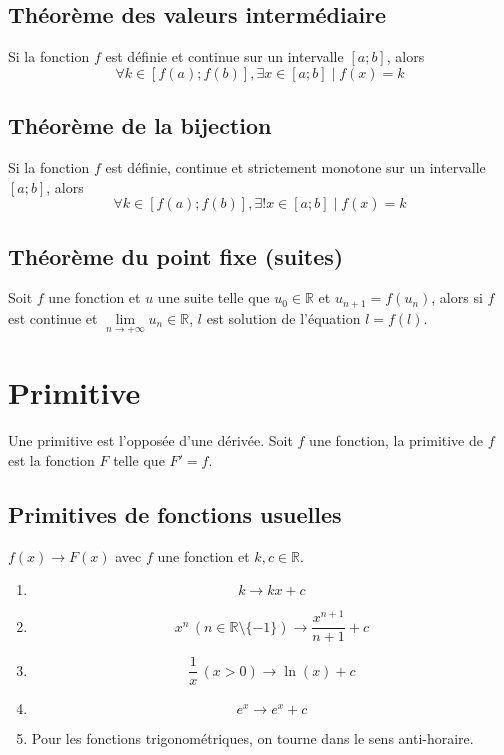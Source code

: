 \documentclass{article}
\begin{document}
\subsection{Théorème des valeurs intermédiaire}
Si la fonction $f$ est définie et continue sur un intervalle $[a;b]$, alors $$\forall k \in [f(a);f(b)], \exists x \in [a;b] \mid f(x) = k$$
\subsection{Théorème de la bijection}
Si la fonction $f$ est définie, continue et strictement monotone sur un intervalle $[a;b]$, alors $$\forall k \in [f(a);f(b)], \exists ! x \in [a;b] \mid f(x) = k$$
\subsection{Théorème du point fixe (suites)}
Soit $f$ une fonction et $u$ une suite telle que $u_0 \in \mathbb{R}$ et $u_{n+1} = f(u_n)$, alors si $f$ est continue et $\lim \limits_{n \rightarrow +\infty} u_n \in \mathbb{R}$, $l$ est solution de l'équation $l = f(l)$.


\section{Primitive}
Une primitive est l'opposée d'une dérivée. Soit $f$ une fonction, la primitive de $f$ est la fonction $F$ telle que $F' = f$.

\subsection{Primitives de fonctions usuelles}
$f(x) \rightarrow F(x)$ avec $f$ une fonction et $k,c\in\mathbb{R}$.
\begin{enumerate}
	\item[] $$k \rightarrow kx + c$$
	\item[] $$x^n \, (n\in \mathbb{R} \setminus \{-1\}) \rightarrow \frac{x^{n+1}}{n+1}+c$$
	\item[] $$\frac{1}{x} \, (x>0) \rightarrow \ln(x)+c$$
	\item[] $$e^x \rightarrow e^x+c$$
	\item[] \begin{center}Pour les fonctions trigonométriques, on tourne dans le sens anti-horaire.\end{center}
\end{enumerate}
\end{document}
